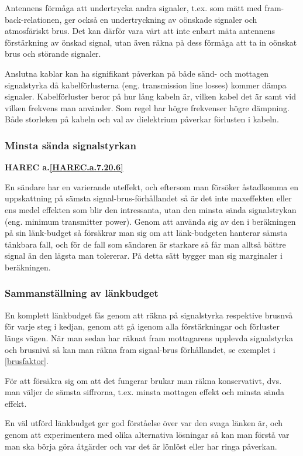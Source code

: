 Antennens förmåga att undertrycka andra signaler, t.ex. som mätt med
fram-back-relationen, ger också en undertryckning av oönskade signaler och
atmosfäriskt brus.
Det kan därför vara värt att inte enbart mäta antennens förstärkning av
önskad signal, utan även räkna på dess förmåga att ta in oönskat brus och
störande signaler.

Anslutna kablar kan ha signifikant påverkan på både sänd- och mottagen
signalstyrka då kabelförlusterna (eng. transmission line losses) kommer dämpa
signaler.
Kabelförluster beror på hur lång kabeln är, vilken kabel det är samt vid
vilken frekvens man använder.
Som regel har högre frekvenser högre dämpning.
Både storleken på kabeln och val av dielektrium påverkar förlusten i kabeln.


\subsubsection{Minsta sända signalstyrkan}
\textbf{HAREC a.\ref{HAREC.a.7.20.6}\label{myHAREC.a.7.20.6}}

En sändare har en varierande uteffekt, och eftersom man försöker åstadkomma en
uppskattning på sämsta signal-brus-förhållandet så är det inte maxeffekten
eller ens medel effekten som blir den intressanta, utan den minsta sända
signalstrykan (eng. minimum transmitter power).
Genom att använda sig av den i beräkningen på sin länk-budget så försäkrar man
sig om att länk-budgeten hanterar sämsta tänkbara fall, och för de fall som
sändaren är starkare så får man alltså bättre signal än den lägsta man
tolererar.
På detta sätt bygger man sig marginaler i beräkningen.

\subsubsection{Sammanställning av länkbudget}

En komplett länkbudget fås genom att räkna på signalstyrka respektive brusnvå
för varje steg i kedjan, genom att gå igenom alla förstärkningar och förluster
längs vägen.
När man sedan har räknat fram mottagarens upplevda signalstyrka och brusnivå så
kan man räkna fram signal-brus förhållandet, se exemplet i \ref{brusfaktor}.

För att försäkra sig om att det fungerar brukar man räkna konservativt, dvs.
man väljer de sämsta siffrorna, t.ex. minsta mottagen effekt och minsta sända
effekt.

En väl utförd länkbudget ger god förståelse över var den svaga länken är,
och genom att experimentera med olika alternativa lösningar så kan man
förstå var man ska börja göra åtgärder och var det är lönlöst eller har
ringa påverkan.
